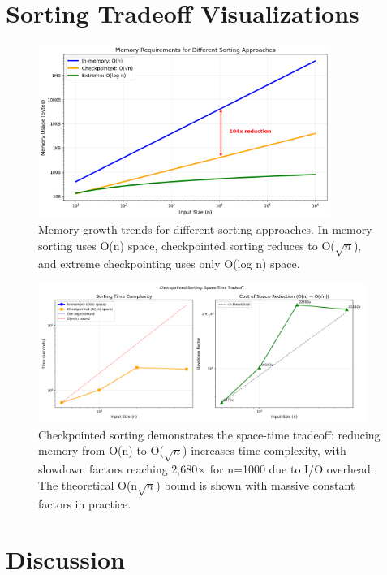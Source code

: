 \documentclass[11pt]{article}
\theoremstyle{definition}
\begin{document}
\FloatBarrier
\section{Sorting Tradeoff Visualizations}
\label{sec:sorting}

\begin{figure}[!htbp]
\centering
\includegraphics[width=0.85\textwidth]{figures/sorting_memory.png}
\caption{Memory growth trends for different sorting approaches. In-memory sorting uses O(n) space, checkpointed sorting reduces to O($\sqrt{n}$), and extreme checkpointing uses only O(log n) space.}
\label{fig:sort_memory}
\end{figure}

\begin{figure}[!htbp]
\centering
\includegraphics[width=0.95\textwidth]{figures/sorting_tradeoff.png}
\caption{Checkpointed sorting demonstrates the space-time tradeoff: reducing memory from O(n) to O($\sqrt{n}$) increases time complexity, with slowdown factors reaching 2,680× for n=1000 due to I/O overhead. The theoretical O(n$\sqrt{n}$) bound is shown with massive constant factors in practice.}
\label{fig:sort_tradeoff}
\end{figure}
\section{Discussion}
\end{document}
